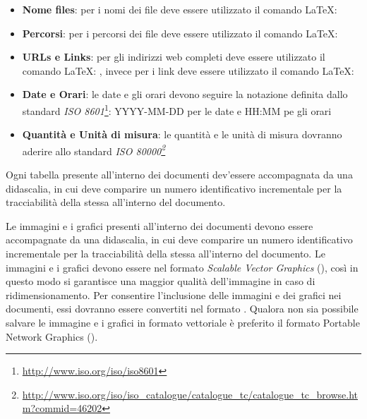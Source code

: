 \documentclass[12pt,a4paper]{article}
\begin{document}
\begin{itemize}
  \item \textbf{Nome files}: per i nomi dei file deve essere utilizzato il comando \LaTeX: 
  \item  \textbf{Percorsi}: per i percorsi dei file deve essere utilizzato il comando \LaTeX: 
  \item \textbf{URLs e Links}:  per gli indirizzi web completi deve essere utilizzato il comando \LaTeX: , invece per i link deve essere utilizzato il comando \LaTeX: 
  \item \textbf{Date e Orari}: le date e gli orari devono seguire la notazione definita dallo standard \emph{ISO 8601}\footnote{\url{http://www.iso.org/iso/iso8601}}: YYYY-MM-DD per le date e HH:MM pe gli orari
  \item \textbf{Quantità e Unità di misura}: le quantità e le unità di misura dovranno aderire allo standard \emph{ISO 80000\footnote{\url{http://www.iso.org/iso/iso_catalogue/catalogue_tc/catalogue_tc_browse.htm?commid=46202}}}
\end{itemize}

Ogni tabella presente all'interno dei documenti dev'essere accompagnata da una didascalia, in cui deve comparire un numero identificativo incrementale per la tracciabilità della stessa all'interno del documento.

Le immagini e i grafici presenti all'interno dei documenti devono essere accompagnate da una didascalia, in cui deve comparire un numero identificativo incrementale per la tracciabilità della stessa all'interno del documento. Le immagini e i grafici devono essere nel formato \emph{Scalable Vector Graphics} (), così in questo modo si garantisce una maggior qualità dell'immagine in caso di ridimensionamento. Per consentire l'inclusione delle immagini e dei grafici nei documenti, essi dovranno essere convertiti nel formato  . Qualora non sia possibile salvare le immagine e i grafici in formato vettoriale è preferito il formato Portable Network Graphics ().
\end{document}
